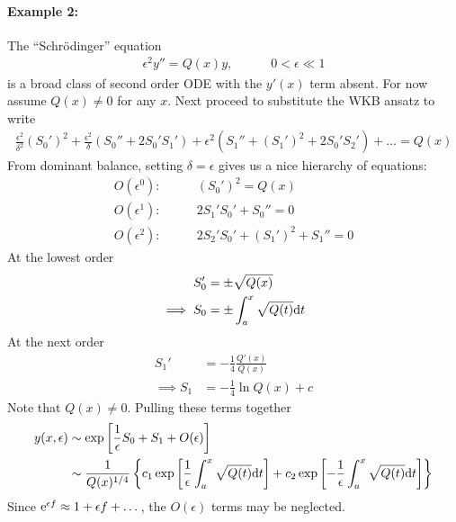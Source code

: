 \paragraph{Example 2:} The ``Schr\"{o}dinger'' equation 
\begin{gather*}
	\epsilon^2 y'' = Q(x) y, \qquad\quad  0 < \epsilon \ll 1
\end{gather*}
is a broad class of second order ODE with the $y'(x)$ term absent. For now assume $Q(x) \neq 0$ for any $x$. Next proceed to substitute the WKB ansatz to write
\begin{align*}
	 \frac{\epsilon^2}{\delta^2} (S_0')^2 + \frac{\epsilon^2}{\delta} (S_0'' + 2 S_0' S_1') + \epsilon^2 (S_1'' + (S_1')^2 + 2 S_0' S_2') + \dots = Q(x)
\end{align*}
From dominant balance, setting $\delta = \epsilon$ gives us a nice hierarchy of equations:
\begin{align*}
	O(\epsilon^0):& \qquad (S_0')^2 = Q(x) \\
	O(\epsilon^1):& \qquad 2S_1'S_0' + S_0'' = 0 \\
	O(\epsilon^2):& \qquad 2S_2'S_0' + (S_1')^2 + S_1'' = 0 
\end{align*}
At the lowest order
\begin{align*}
	S_0' &= \pm \sqrt{Q(x)} \\
	\implies S_0 &= \pm \int_{a}^{x} \sqrt{Q(t)} \mathrm{d} t
\end{align*}
At the next order
\begin{align*}
	S_1' &= -\frac{1}{4} \frac{Q'(x)}{Q(x)} \\
	\implies S_1 &= -\frac{1}{4} \ln Q(x) + c
\end{align*}
Note that $Q(x) \neq 0$. Pulling these terms together
\begin{align}
	y(x,\epsilon) &\sim \exp \left[\frac{1}{\epsilon} S_0 + S_1 + O(\epsilon)\right] \nonumber\\
	& \sim \frac{1}{Q(x)^{1/4}} \left\{ c_1 \exp \left[\frac{1}{\epsilon} \int_{a}^{x} \sqrt{Q(t)}\mathrm{d} t \right]+ c_2 \exp \left[-\frac{1}{\epsilon} \int_{a}^{x} \sqrt{Q(t)}\mathrm{d} t \right] \right\} \label{eqn:wk18-wkb}
\end{align}
Since $\mathrm{e}^{\epsilon f } \approx 1 + \epsilon f + \dots $, the $O(\epsilon)$ terms may be neglected. 

